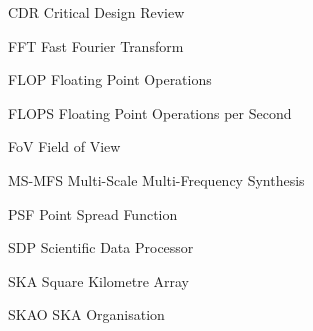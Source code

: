 \documentclass[11pt,a4paper]{article}
\begin{document}
\tccfrontpage

\sdptableofcontents

\sdplistofabbreviations
\begin{basedescript}{\desclabelstyle{\pushlabel}\desclabelwidth{6em}}
    \item[CDR] Critical Design Review \vspace{-0.2cm}
    \item[FFT] Fast Fourier Transform\vspace{-0.2cm}
    \item[FLOP] Floating Point Operations \vspace{-0.2cm}
    \item[FLOPS] Floating Point Operations per Second \vspace{-0.2cm}
    \item[FoV] Field of View\vspace{-0.2cm}
    \item[MS-MFS] Multi-Scale Multi-Frequency Synthesis\vspace{-0.2cm}
    \item[PSF] Point Spread Function \vspace{-0.2cm}
    \item[SDP] Scientific Data Processor\vspace{-0.2cm}
    \item[SKA] Square Kilometre Array\vspace{-0.2cm}
    \item[SKAO] SKA Organisation\vspace{-0.2cm}
\end{basedescript} 

\newcommand{\nuno}{{\left(\frac{\nu}{\nu_0}\right)}}
\newcommand{\dnuno}{{\left(\frac{\nu-\nu_0}{\nu_0}\right)}}

\newcommand{\dg}{^\dag}
\newcommand{\X}{\vec{x}}
\newcommand{\Xd}{\vec{{x}^\dag}}
\newcommand{\B}{\vec{b}}
\newcommand{\Bd}{\vec{b^\dag}}
\newcommand{\V}{\vec{V}}
\newcommand{\Vd}{\vec{V^\dag}}
\newcommand{\A}{{\tens{A}{s}}}
\newcommand{\Ad}{{\tens{A^\dag}{s}}}
\newcommand{\F}{{\tens{F}{s}}}
\newcommand{\Fd}{{\tens{F^\dag}{s}}}
\newcommand{\He}{{\tens{H}{s}}}
\newcommand{\Sa}{{\tens{S}{s}}}
\newcommand{\Sd}{{\tens{S^\dag}{s}}}
\newcommand{\Sna}{\tens{{S_{\nu}}{s}}}
\newcommand{\Snd}{\tens{{S_{\nu}^\dag}{s}}}
\newcommand{\T}{{\tens{T}{s}}}
\newcommand{\W}{{\tens{W}{s}}}
\newcommand{\Wd}{{\tens{W^\dag}{s}}}
\newcommand{\Pb}{{\vec{P}}}
\end{document}
